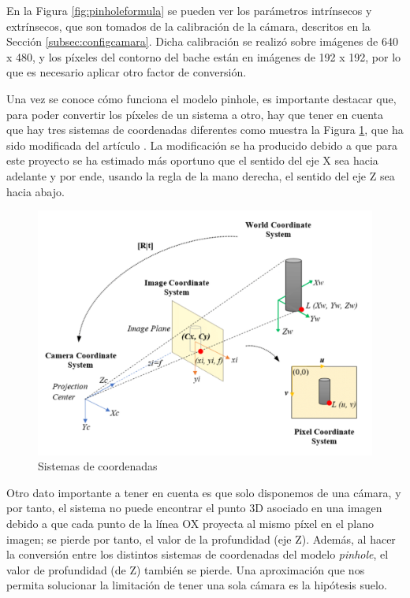 En la Figura \ref{fig:pinholeformula} se pueden ver los parámetros intrínsecos y extrínsecos, que son tomados de la calibración de la cámara, descritos en la Sección \ref{subsec:configcamara}. Dicha calibración se realizó sobre imágenes de 640 x 480, y los píxeles del contorno del bache están en imágenes de 192 x 192, por lo que es necesario aplicar otro factor de conversión. 

Una vez se conoce cómo funciona el modelo pinhole, es importante destacar que, para poder convertir los píxeles de un sistema a otro, hay que tener en cuenta que hay tres sistemas de coordenadas diferentes como muestra la Figura \ref{fig:siscoordenadas}, que ha sido modificada del artículo \cite{201705.0170}. La modificación se ha producido debido a que para este proyecto se ha estimado más oportuno que el sentido del eje X sea hacia adelante y por ende, usando la regla de la mano derecha, el sentido del eje Z sea hacia abajo.

 \begin{figure} [h!]
	\begin{center}
		\includegraphics[width=14cm]{figs/cap6/pinholecoordinates.png}
	\end{center}
	\caption{Sistemas de coordenadas}
	\label{fig:siscoordenadas}
\end{figure}

Otro dato importante a tener en cuenta es que solo disponemos de una cámara, y por tanto, el sistema no puede encontrar el punto 3D asociado en una imagen debido a que cada punto de la línea OX proyecta al mismo píxel en el plano imagen; se pierde por tanto, el valor de la profundidad (eje Z). Además, al hacer la conversión entre los distintos sistemas de coordenadas del modelo \textit{pinhole}, el valor de profundidad (de Z) también se pierde. Una aproximación que nos permita solucionar la limitación de tener una sola cámara es la hipótesis suelo. 

